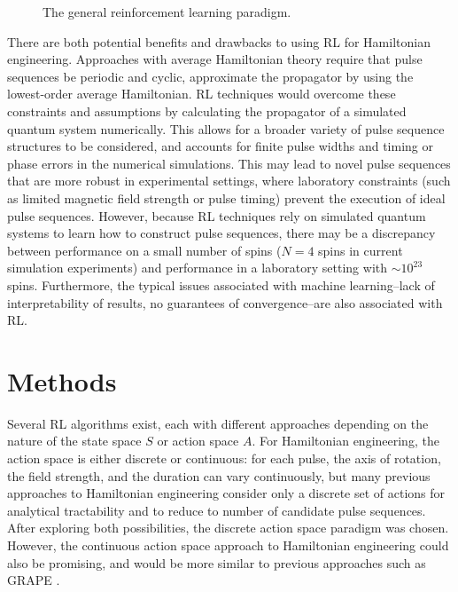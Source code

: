 \documentclass{article}
\begin{document}
\begin{figure}[ht]
    \centering
    \caption{The general reinforcement learning paradigm.}
    \label{fig:RL}
\end{figure}

There are both potential benefits and drawbacks to using RL for Hamiltonian engineering. Approaches with average Hamiltonian theory require that pulse sequences be periodic and cyclic, approximate the propagator by using the lowest-order average Hamiltonian. RL techniques would overcome these constraints and assumptions by calculating the propagator of a simulated quantum system numerically. This allows for a broader variety of pulse sequence structures to be considered, and accounts for finite pulse widths and timing or phase errors in the numerical simulations.
This may lead to novel pulse sequences that are more robust in experimental settings, where laboratory constraints (such as limited magnetic field strength or pulse timing) prevent the execution of ideal pulse sequences.
However, because RL techniques rely on simulated quantum systems to learn how to construct pulse sequences, there may be a discrepancy between performance on a small number of spins ($N=4$ spins in current simulation experiments) and performance in a laboratory setting with $\sim10^{23}$ spins. Furthermore, the typical issues associated with machine learning--lack of interpretability of results, no guarantees of convergence--are also associated with RL.

\section{Methods}

Several RL algorithms exist, each with different approaches depending on the nature of the state space $S$ or action space $A$. For Hamiltonian engineering, the action space is either discrete or continuous: for each pulse, the axis of rotation, the field strength, and the duration can vary continuously, but many previous approaches to Hamiltonian engineering consider only a discrete set of actions for analytical tractability and to reduce to number of candidate pulse sequences. After exploring both possibilities, the discrete action space paradigm was chosen. However, the continuous action space approach to Hamiltonian engineering could also be promising, and would be more similar to previous approaches such as GRAPE \cite{Khaneja-2005}.
\end{document}
